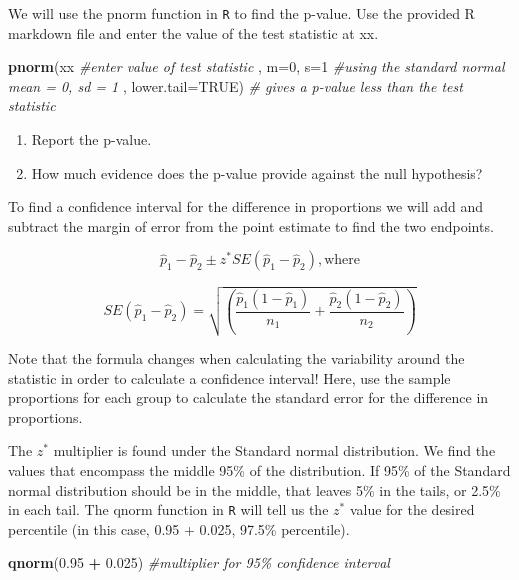 \documentclass[
]{report}
\newenvironment{Shaded}{\begin{snugshade}}{\end{snugshade}}
\newcommand{\CommentTok}[1]{\textcolor[rgb]{0.56,0.35,0.01}{\textit{#1}}}
\newcommand{\DataTypeTok}[1]{\textcolor[rgb]{0.13,0.29,0.53}{#1}}
\newcommand{\DecValTok}[1]{\textcolor[rgb]{0.00,0.00,0.81}{#1}}
\newcommand{\FloatTok}[1]{\textcolor[rgb]{0.00,0.00,0.81}{#1}}
\newcommand{\KeywordTok}[1]{\textcolor[rgb]{0.13,0.29,0.53}{\textbf{#1}}}
\newcommand{\NormalTok}[1]{#1}
\newcommand{\OperatorTok}[1]{\textcolor[rgb]{0.81,0.36,0.00}{\textbf{#1}}}
\newcommand{\OtherTok}[1]{\textcolor[rgb]{0.56,0.35,0.01}{#1}}
\newcommand{\StringTok}[1]{\textcolor[rgb]{0.31,0.60,0.02}{#1}}
\begin{document}
We will use the pnorm function in \texttt{R} to find the p-value. Use the provided R markdown file and enter the value of the test statistic at xx.

\begin{Shaded}
\begin{Highlighting}[]
    \KeywordTok{pnorm}\NormalTok{(xx }\CommentTok{\#enter value of test statistic}
\NormalTok{      , }\DataTypeTok{m=}\DecValTok{0}\NormalTok{, }\DataTypeTok{s=}\DecValTok{1} \CommentTok{\#using the standard normal mean = 0, sd = 1}
\NormalTok{      , }\DataTypeTok{lower.tail=}\OtherTok{TRUE}\NormalTok{) }\CommentTok{\# gives a p{-}value less than the test statistic}
\end{Highlighting}
\end{Shaded}

\begin{enumerate}
\def\labelenumi{\arabic{enumi}.}
\setcounter{enumi}{19}
\item
  Report the p-value.
  \vspace{0.2in}
\item
  How much evidence does the p-value provide against the null hypothesis?
\end{enumerate}

\vspace{0.4in}

To find a confidence interval for the difference in proportions we will add and subtract the margin of error from the point estimate to find the two endpoints.

\[\hat{p}_1-\hat{p}_2\pm z^*SE(\hat{p}_1-\hat{p}_2), \text{where}\]

\[SE(\hat{p}_1-\hat{p}_2) = \sqrt{\left(\frac{\hat{p}_1 (1-\hat{p}_1)}{n_1}+\frac{\hat{p}_2 (1-\hat{p}_2)}{n_2}\right)}\]

Note that the formula changes when calculating the variability around the statistic in order to calculate a confidence interval! Here, use the sample proportions for each group to calculate the standard error for the difference in proportions.

The \(z^*\) multiplier is found under the Standard normal distribution. We find the values that encompass the middle 95\% of the distribution. If 95\% of the Standard normal distribution should be in the middle, that leaves 5\% in the tails, or 2.5\% in each tail. The qnorm function in \texttt{R} will tell us the \(z^*\) value for the desired percentile (in this case, 0.95 + 0.025, 97.5\% percentile).

\begin{Shaded}
\begin{Highlighting}[]
\KeywordTok{qnorm}\NormalTok{(}\FloatTok{0.95} \OperatorTok{+}\StringTok{ }\FloatTok{0.025}\NormalTok{) }\CommentTok{\#multiplier for 95\% confidence interval}
\end{Highlighting}
\end{Shaded}
\end{document}
